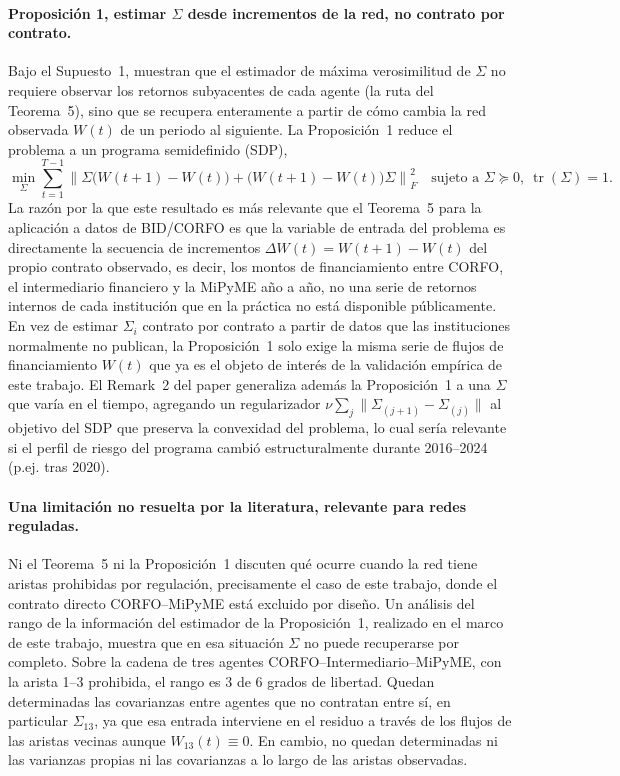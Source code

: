 \paragraph{Proposición 1, estimar $\Sigma$ desde incrementos de la red, no contrato por contrato.}
Bajo el Supuesto~1,  muestran que el estimador de máxima verosimilitud de $\Sigma$ no requiere observar los retornos subyacentes de cada agente (la ruta del Teorema~5), sino que se recupera enteramente a partir de cómo cambia la red observada $W(t)$ de un periodo al siguiente. La Proposición~1 reduce el problema a un programa semidefinido (SDP),
\begin{equation}
\label{eq:prop1}
    \min_{\Sigma} \sum_{t=1}^{T-1} \left\| \Sigma\big(W(t+1)-W(t)\big) + \big(W(t+1)-W(t)\big)\Sigma \right\|_F^2
    \quad \text{sujeto a } \Sigma \succeq 0,\ \operatorname{tr}(\Sigma)=1.
\end{equation}
La razón por la que este resultado es más relevante que el Teorema~5 para la aplicación a datos de BID/CORFO es que la variable de entrada del problema es directamente la secuencia de incrementos $\Delta W(t) = W(t+1)-W(t)$ del propio contrato observado, es decir, los montos de financiamiento entre CORFO, el intermediario financiero y la MiPyME año a año, no una serie de retornos internos de cada institución que en la práctica no está disponible públicamente. En vez de estimar $\Sigma_i$ contrato por contrato a partir de datos que las instituciones normalmente no publican, la Proposición~1 solo exige la misma serie de flujos de financiamiento $W(t)$ que ya es el objeto de interés de la validación empírica de este trabajo. El Remark~2 del paper generaliza además la Proposición~1 a una $\Sigma$ que varía en el tiempo, agregando un regularizador $\nu\sum_j \|\Sigma_{(j+1)}-\Sigma_{(j)}\|$ al objetivo del SDP que preserva la convexidad del problema, lo cual sería relevante si el perfil de riesgo del programa cambió estructuralmente durante 2016--2024 (p.ej. tras 2020).

\paragraph{Una limitación no resuelta por la literatura, relevante para redes reguladas.}
Ni el Teorema~5 ni la Proposición~1 discuten qué ocurre cuando la red tiene aristas prohibidas por regulación, precisamente el caso de este trabajo, donde el contrato directo CORFO--MiPyME está excluido por diseño. Un análisis del rango de la información del estimador de la Proposición~1, realizado en el marco de este trabajo, muestra que en esa situación $\Sigma$ no puede recuperarse por completo. Sobre la cadena de tres agentes CORFO--Intermediario--MiPyME, con la arista 1--3 prohibida, el rango es 3 de 6 grados de libertad. Quedan determinadas las covarianzas entre agentes que no contratan entre sí, en particular $\Sigma_{13}$, ya que esa entrada interviene en el residuo a través de los flujos de las aristas vecinas aunque $W_{13}(t)\equiv 0$. En cambio, no quedan determinadas ni las varianzas propias ni las covarianzas a lo largo de las aristas observadas.

